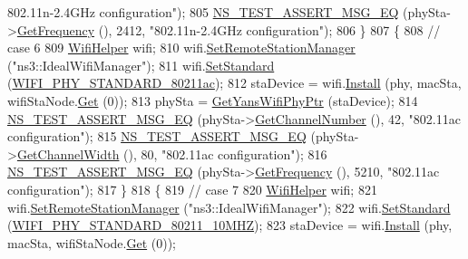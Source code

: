 \begin{DoxyCode}
{      802.11n-2.4GHz configuration"});
805     \hyperlink{group__testing_ga2a9d78cffb3db8e867c35fff0b698cf5}{NS\_TEST\_ASSERT\_MSG\_EQ} (phySta->\hyperlink{classns3_1_1WifiPhy_ad2508d94faf22d690d6b8b4367934fd1}{GetFrequency} (), 2412, \textcolor{stringliteral}{"802.11n-2.4GHz
       configuration"});
806   \}
807   \{
808     \textcolor{comment}{// case 6}
809     \hyperlink{classns3_1_1WifiHelper}{WifiHelper} wifi;
810     wifi.\hyperlink{classns3_1_1WifiHelper_a3d01b178aeb2de246ab5a3aa5638ce24}{SetRemoteStationManager} (\textcolor{stringliteral}{"ns3::IdealWifiManager"});
811     wifi.\hyperlink{classns3_1_1WifiHelper_aa54f3e61527ef8de318d310045bc5dfd}{SetStandard} (\hyperlink{group__wifi_gga1299834f4e1c615af3ca738033b76a49a7c078959de635b84fb280a955dcfb27e}{WIFI\_PHY\_STANDARD\_80211ac});
812     staDevice = wifi.\hyperlink{classns3_1_1WifiHelper_a451b3d33fa1497c22f06c5451f57a127}{Install} (phy, macSta, wifiStaNode.\hyperlink{classns3_1_1NodeContainer_a9ed96e2ecc22e0f5a3d4842eb9bf90bf}{Get} (0));
813     phySta = \hyperlink{classSetChannelFrequencyTest_aa30a0a39f98c2d825152681ba8b9f4e1}{GetYansWifiPhyPtr} (staDevice);
814     \hyperlink{group__testing_ga2a9d78cffb3db8e867c35fff0b698cf5}{NS\_TEST\_ASSERT\_MSG\_EQ} (phySta->\hyperlink{classns3_1_1WifiPhy_a5cf0ccf06109ace61db51c83e91b7e8d}{GetChannelNumber} (), 42, \textcolor{stringliteral}{"802.11ac
       configuration"});
815     \hyperlink{group__testing_ga2a9d78cffb3db8e867c35fff0b698cf5}{NS\_TEST\_ASSERT\_MSG\_EQ} (phySta->\hyperlink{classns3_1_1WifiPhy_a4a5d5009b3b3308f2baeed42a2007189}{GetChannelWidth} (), 80, \textcolor{stringliteral}{"802.11ac
       configuration"});
816     \hyperlink{group__testing_ga2a9d78cffb3db8e867c35fff0b698cf5}{NS\_TEST\_ASSERT\_MSG\_EQ} (phySta->\hyperlink{classns3_1_1WifiPhy_ad2508d94faf22d690d6b8b4367934fd1}{GetFrequency} (), 5210, \textcolor{stringliteral}{"802.11ac
       configuration"});
817   \}
818   \{
819     \textcolor{comment}{// case 7}
820     \hyperlink{classns3_1_1WifiHelper}{WifiHelper} wifi;
821     wifi.\hyperlink{classns3_1_1WifiHelper_a3d01b178aeb2de246ab5a3aa5638ce24}{SetRemoteStationManager} (\textcolor{stringliteral}{"ns3::IdealWifiManager"});
822     wifi.\hyperlink{classns3_1_1WifiHelper_aa54f3e61527ef8de318d310045bc5dfd}{SetStandard} (\hyperlink{group__wifi_gga1299834f4e1c615af3ca738033b76a49aff863c98db467eb76170dc8bbe743de7}{WIFI\_PHY\_STANDARD\_80211\_10MHZ});
823     staDevice = wifi.\hyperlink{classns3_1_1WifiHelper_a451b3d33fa1497c22f06c5451f57a127}{Install} (phy, macSta, wifiStaNode.\hyperlink{classns3_1_1NodeContainer_a9ed96e2ecc22e0f5a3d4842eb9bf90bf}{Get} (0));

\end{DoxyCode}
